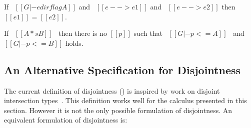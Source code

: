 \begin{theorem}[Determinism]
\label{lemma:union:determinism}
  If \ $[[G |- e dirflag A]]$ and \ $[[e --> e1]]$ and \ $[[e --> e2]]$ then $[[e1]]$ = $[[e2]]$.
\end{theorem}

\begin{comment}
\begin{proof}
  By induction on first reduction relation and inverting second reduction relation subsequently.
  All cases are trivial to solve by simple inversions except:
  \begin{itemize}
    \item Case \rref{typ-typeof} requires \cref{lemma:union:check-both-disj-false}.
  \end{itemize}
\end{proof}
\end{comment}

\begin{lemma}
\label{lemma:union:check-both-disj-false}
If \ $[[A *s B]]$ \ then there is no $[[p]]$ such that
\ $[[G |- p <= A]]$ \ and \ $[[G |- p <= B]]$ holds.
\end{lemma}



\subsection{An Alternative Specification for Disjointness}
\label{sec:union:discussion}
\begin{comment}
\snow{I feel the reason and consequence are flipped here. 
The alternative spec definitely equals to the previous one
because we define ``ordinary types" to satisfy:
1) no bottom-like types are ordinary;
2) any type must have an ordinary subtype if it is not bottom-like.
Or we need to provide some intuition for ordinary types themselves.}
\end{comment}

The current definition of disjointness () is inspired
by work on disjoint intersection types~\cite{oliveira2016disjoint}. This definition works well
for the calculus presented in this section. However it is not the only
possible formulation of disjointness.
An equivalent formulation of disjointness is:

